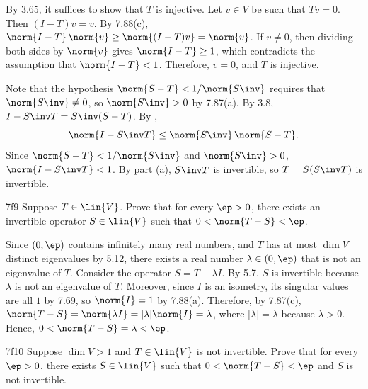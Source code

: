 \begin{solenum}
    \item By 3.65, it suffices to show that $T$ is injective.
    Let $v \in V$ be such that $Tv = 0$.
    Then $(I - T) v = v$.
    By 7.88(c), $\norm{I - T}\,\norm{v} \geq \norm{(I - T)v} = \norm{v}$.
    If $v \neq 0$, then dividing both sides by $\norm{v}$ gives $\norm{I - T} \geq 1$, which contradicts the assumption that $\norm{I - T} < 1$.
    Therefore, $v = 0$, and $T$ is injective.
    \item Note that the hypothesis $\norm{S - T} < 1/\norm{S\inv}$ requires that $\norm{S\inv} \neq 0$, so $\norm{S\inv} > 0$ by 7.87(a).
    By 3.8, $I - S\inv T = S\inv(S - T)$.
    By , 
    \[
        \norm{I - S\inv T} \leq \norm{S\inv}\,\norm{S - T}.
    \]
    Since $\norm{S - T} < 1/\norm{S\inv}$ and $\norm{S\inv} > 0$, $\norm{I - S\inv T} < 1$.
    By part (a), $S\inv T$ is invertible, so $T = S (S\inv T)$ is invertible.
\end{solenum}

\begin{exercise}{7f9}
    Suppose $T \in \lin{V}$.
    Prove that for every $\ep > 0$, there exists an invertible operator $S \in \lin{V}$ such that $0 < \norm{T - S} < \ep$.

\end{exercise}

\begin{sol}
    Since $(0, \ep)$ contains infinitely many real numbers, and $T$ has at most $\dim V$ distinct eigenvalues by 5.12, there exists a real number $\lambda \in (0, \ep)$ that is not an eigenvalue of $T$.
    Consider the operator $S = T - \lambda I$.
    By 5.7, $S$ is invertible because $\lambda$ is not an eigenvalue of $T$.
    Moreover, since $I$ is an isometry, its singular values are all $1$ by 7.69, so $\norm{I} = 1$ by 7.88(a).
    Therefore, by 7.87(c), $\norm{T - S} = \norm{\lambda I} = |\lambda| \norm{I} = \lambda$, where $|\lambda| = \lambda$ because $\lambda > 0$.
    Hence, $0 < \norm{T - S} = \lambda < \ep$.
\end{sol}

\begin{exercise}{7f10}
    Suppose $\dim V > 1$ and $T \in \lin{V}$ is not invertible.
    Prove that for every $\ep > 0$, there exists $S \in \lin{V}$ such that $0 < \norm{T - S} < \ep$ and $S$ is not invertible.
\end{exercise}

